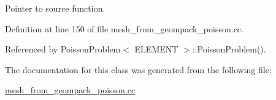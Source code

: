 Pointer to source function. 



Definition at line 150 of file mesh\+\_\+from\+\_\+geompack\+\_\+poisson.\+cc.



Referenced by Poisson\+Problem$<$ E\+L\+E\+M\+E\+N\+T $>$\+::\+Poisson\+Problem().



The documentation for this class was generated from the following file\+:\begin{DoxyCompactItemize}
\item 
\hyperlink{mesh__from__geompack__poisson_8cc}{mesh\+\_\+from\+\_\+geompack\+\_\+poisson.\+cc}\end{DoxyCompactItemize}
